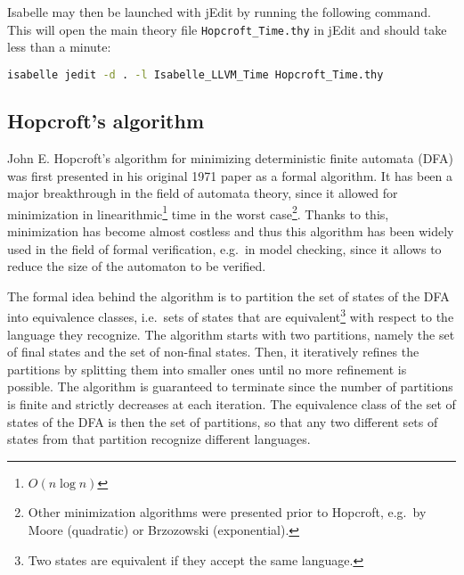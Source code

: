 \documentclass[12pt, a4 paper]{article}
\theoremstyle{definition}
\begin{document}
Isabelle may then be launched with jEdit by running the following command. This will open the main theory file \texttt{Hopcroft\_Time.thy} in jEdit and should take less than a minute:
\begin{lstlisting}[language=bash]
isabelle jedit -d . -l Isabelle_LLVM_Time Hopcroft_Time.thy
\end{lstlisting}

\subsection{Hopcroft's algorithm}
John E. Hopcroft's algorithm for minimizing deterministic finite automata (DFA) was first presented in his original 1971 paper \cite{Hop71} as a formal algorithm.
It has been a major breakthrough in the field of automata theory, since it allowed for minimization in linearithmic\footnote{$O(n \log n)$} time in the worst case\footnote{Other minimization algorithms were presented prior to Hopcroft, e.g.\ by Moore (quadratic) or Brzozowski (exponential).}.
Thanks to this, minimization has become almost costless and thus this algorithm has been widely used in the field of formal verification, e.g.\ in model checking, since it allows to reduce the size of the automaton to be verified.

The formal idea behind the algorithm is to partition the set of states of the DFA into equivalence classes, i.e.\ sets of states that are equivalent\footnote{Two states are equivalent if they accept the same language.} with respect to the language they recognize.
The algorithm starts with two partitions, namely the set of final states and the set of non-final states.
Then, it iteratively refines the partitions by splitting them into smaller ones until no more refinement is possible.
The algorithm is guaranteed to terminate since the number of partitions is finite and strictly decreases at each iteration.
The equivalence class of the set of states of the DFA is then the set of partitions, so that any two different sets of states from that partition recognize different languages.

\bigskip
\end{document}

